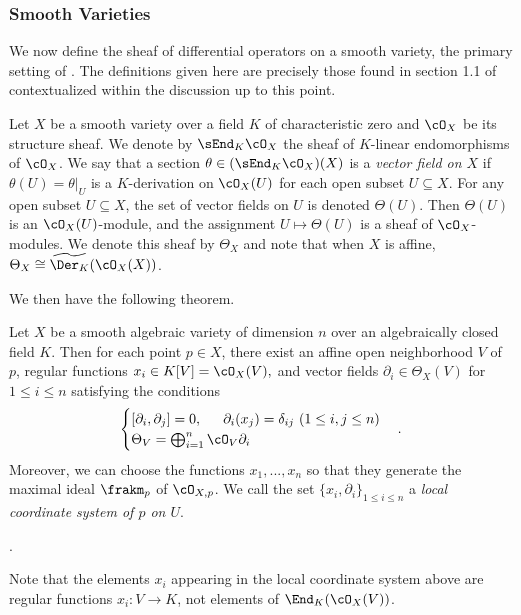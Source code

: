 \subsubsection{Smooth Varieties}\label{sec:diff-ops-smooth-varieties}
We now define the sheaf of differential operators on a smooth variety, the primary setting of \cite{d-mod_ps-rt}. The definitions given here are precisely those found in section 1.1 of \cite{d-mod_ps-rt} contextualized within the discussion up to this point.

\begin{defn}\label{defn:diff-ops-on-variety}
	Let $X$ be a smooth variety over a field $K$ of characteristic zero and $\cO_X$ be its structure sheaf. We denote by $\sEnd_K\cO_X$ the sheaf of $K$-linear endomorphisms of $\cO_X$. We say that a section $\theta \in (\sEnd_K\cO_X)(X)$ is a \emph{vector field on $X$} if $\theta(U) = \theta|_U$ is a $K$-derivation on $\cO_X(U)$ for each open subset $U \subseteq X$. For any open subset $U \subseteq X$, the set of vector fields on $U$ is denoted $\Theta(U)$. Then $\Theta(U)$ is an $\cO_X(U)$-module, and the assignment $U\mapsto \Theta(U)$ is a sheaf of $\cO_X$-modules. We denote this sheaf by $\Theta_X$ and note that when $X$ is affine, $\Theta_X \cong \widetilde{\Der_K}(\cO_X(X))$.
\end{defn}
We then have the following theorem.
\begin{thm}\label{thm:sheaf-of-vector-fields}
	Let $X$ be a smooth algebraic variety of dimension $n$ over an algebraically closed field $K$. Then for each point $p \in X$, there exist an affine open neighborhood $V$ of $p$, regular functions $x_i \in K[V] = \cO_X(V),$ and vector fields $\partial_i \in \Theta_X(V)$ for $1\leq i\leq n$ satisfying the conditions
	\begin{align*}
		\begin{cases}
		    [\partial_i,\partial_j] = 0, \hspace{1.5em} \partial_i(x_j) = \delta_{ij} ~ (1\leq i, j\leq n) \\
			\Theta_V = \bigoplus_{i=1}^n \cO_V \partial_i
		\end{cases}.
	\end{align*}
	Moreover, we can choose the functions $x_1,...,x_n$ so that they generate the maximal ideal $\frakm_p$ of $\cO_{X,p}$. We call the set $\{x_i,\partial_i\}_{1\leq i\leq n}$ a \emph{local coordinate system of $p$ on $U$}.
\end{thm}
\begin{prf}
	{\cite[Theorem A.5.1]{d-mod_ps-rt}}.
\end{prf}
Note that the elements $x_i$ appearing in the local coordinate system above are regular functions $x_i:V \to K$, not elements of $\End_K(\cO_X(V))$.

